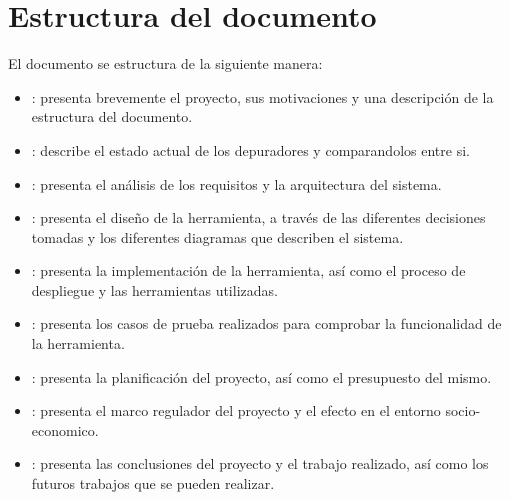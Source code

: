 \section{Estructura del documento}\label{sec:estructura-documento}
El documento se estructura de la siguiente manera:
\begin{itemize}
  \item {}: presenta brevemente el proyecto, sus motivaciones y una descripción de la estructura del documento.
  \item {}: describe el estado actual de los depuradores y comparandolos entre si.
  \item {}: presenta el análisis de los requisitos y la arquitectura del sistema.
  \item {}: presenta el diseño de la herramienta, a través de las diferentes decisiones tomadas y los diferentes diagramas que describen el sistema.
  \item {}: presenta la implementación de la herramienta, así como el proceso de despliegue y las herramientas utilizadas.
  \item {}: presenta los casos de prueba realizados para comprobar  la funcionalidad de la herramienta.
  \item {}: presenta la planificación del proyecto, así como el presupuesto del mismo.
  \item {}: presenta el marco regulador del proyecto y el efecto en el entorno socio-economico. 
  \item {}: presenta las conclusiones del proyecto y el trabajo realizado, así como los futuros trabajos que se pueden realizar.
\end{itemize}